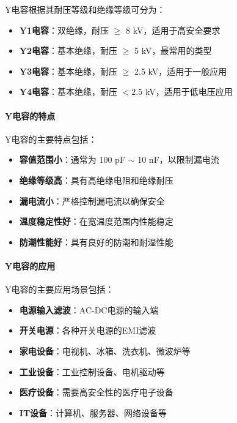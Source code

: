 \documentclass[12pt,UTF8]{ctexbook}
\begin{document}
Y电容根据其耐压等级和绝缘等级可分为：

\begin{itemize}[leftmargin=2cm]
    \item \textbf{Y1电容}：双绝缘，耐压 $\ge$ 8 kV，适用于高安全要求
    \item \textbf{Y2电容}：基本绝缘，耐压 $\ge$ 5 kV，最常用的类型
    \item \textbf{Y3电容}：基本绝缘，耐压 $\ge$ 2.5 kV，适用于一般应用
    \item \textbf{Y4电容}：基本绝缘，耐压 $< 2.5$ kV，适用于低电压应用
\end{itemize}

\paragraph{Y电容的特点}

Y电容的主要特点包括：

\begin{itemize}[leftmargin=2cm]
    \item \textbf{容值范围小}：通常为 100 pF $\sim$ 10 nF，以限制漏电流
    \item \textbf{绝缘等级高}：具有高绝缘电阻和绝缘耐压
    \item \textbf{漏电流小}：严格控制漏电流以确保安全
    \item \textbf{温度稳定性好}：在宽温度范围内性能稳定
    \item \textbf{防潮性能好}：具有良好的防潮和耐湿性能
\end{itemize}

\paragraph{Y电容的应用}

Y电容的主要应用场景包括：

\begin{itemize}[leftmargin=2cm]
    \item \textbf{电源输入滤波}：AC-DC电源的输入端
    \item \textbf{开关电源}：各种开关电源的EMI滤波
    \item \textbf{家电设备}：电视机、冰箱、洗衣机、微波炉等
    \item \textbf{工业设备}：工业控制设备、电机驱动等
    \item \textbf{医疗设备}：需要高安全性的医疗电子设备
    \item \textbf{IT设备}：计算机、服务器、网络设备等
\end{itemize}
\end{document}
